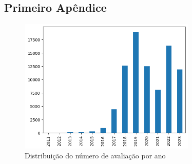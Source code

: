 
\begin{apendicesenv}

\partapendices

\chapter{Primeiro Apêndice}

\begin{figure}
  \centering
  \includegraphics[width=0.75\textwidth]{figs/exploratoria/distribuicao_ano_avaliacao.png}
  \caption{Distribuição do número de avaliação por ano}
  \label{img:dist_ano_avaliacao}
\end{figure}

\end{apendicesenv}
